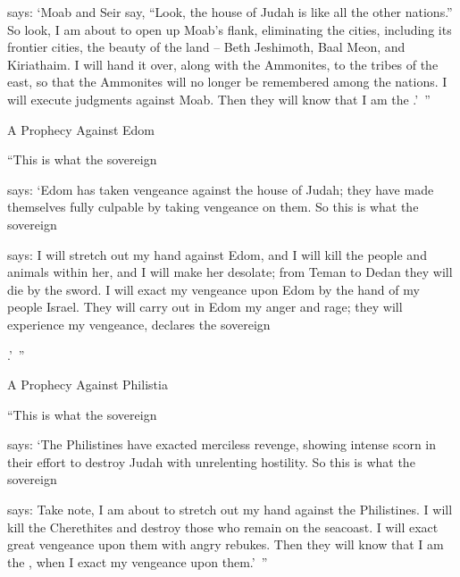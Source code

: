 {{}
says: ‘Moab
and Seir
say, “Look,
the house
of Judah
is like all
the other nations.”
So
look,
I am about to open up
Moab’s
flank,
eliminating the cities,
including its frontier
cities,
the beauty
of the land
– Beth Jeshimoth,
Baal Meon,
and Kiriathaim.
I will hand
it
over,
along
with the Ammonites,
to the tribes
of the east,
so that
the Ammonites
will no longer
be remembered among
the nations.
I will execute
judgments
against Moab.
Then they will know
that
I am
the {}.’ ”
\par }{\SH A Prophecy Against Edom
\par }{\PP {}“This is what the sovereign

{}
says: ‘Edom
has taken vengeance
against the house
of Judah;
they have made
themselves fully culpable
by taking vengeance on them.
So
this is what
the sovereign

{}
says: I will stretch
out my hand
against
Edom,
and I will kill
the people
and animals
within her, and I will make
her desolate;
from Teman
to Dedan
they will die
by the sword.
I will exact
my vengeance
upon Edom
by the hand
of my people
Israel.
They will carry
out in Edom
my anger
and rage;
they will experience
my vengeance,
declares
the sovereign

{}.’ ”
\par }{\SH A Prophecy Against Philistia
\par }{\PP {}“This is what
the sovereign

{}
says: ‘The Philistines
have exacted
merciless
revenge,
showing intense
scorn
in their effort to destroy
Judah with unrelenting
hostility.
So
this
is what
the sovereign

{}
says: Take note, I am about to stretch
out my hand
against
the Philistines.
I will kill
the Cherethites
and destroy
those who remain
on the seacoast.
I will exact
great
vengeance
upon them with angry
rebukes.
Then they will know
that
I am
the {}, when I exact
my vengeance upon them.’ ”

\par }
